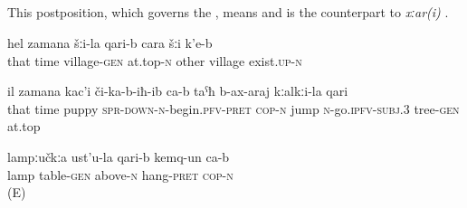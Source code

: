 
\subsection{ }
\label{ssec:postposition qari}

This postposition, which governs the , means  and is the counterpart to \textit{xːar(i)} . 
% 
\begin{exe}
	\ex
	\begin{xlist}
		\ex	\label{In those times upwards from our village there was another village}
		\gll	hel	zamana	šːi-la	qari-b	cara	šːi	k'e-b\\
			that	time	village-\textsc{gen}	at.top-\textsc{n}	other	village	exist.\textsc{up-n}\\
		\glt	{}

		\ex	\label{At that time the puppy began to jump to climb up the tree's top}
		\gll	il	zamana	kac'i	či-ka-b-iħ-ib ca-b	taˁħ	b-ax-araj	kːalkːi-la	qari \\
			that	time	puppy	\textsc{spr-down}-\textsc{n}-begin.\textsc{pfv}-\textsc{pret} \textsc{cop-n}	jump	\textsc{n}-go.\textsc{ipfv}-\textsc{subj.3}	tree-\textsc{gen}	at.top\\
		\glt	{}


		\ex	\label{The lamp hangs above the table.}
		\gll	lampːučkːa	ust'u-la	qari-b	kemq-un	ca-b  \\
			lamp	table-\textsc{gen}	above-\textsc{n}	hang-\textsc{pret}	\textsc{cop-n}\\
		\glt	{} (E)
	\end{xlist}
\end{exe}

